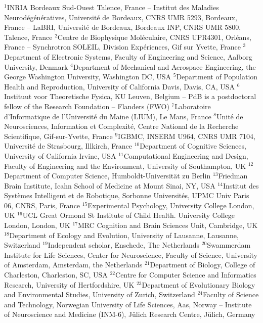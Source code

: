 $^{1}$INRIA Bordeaux Sud-Ouest Talence, France – Institut des Maladies Neurodégénératives, Université de Bordeaux, CNRS UMR 5293, Bordeaux, France – LaBRI, Université de Bordeaux, Bordeaux INP, CNRS UMR 5800, Talence, France
$^{2}$Centre de Biophysique Moléculaire, CNRS UPR4301, Orléans, France -- Synchrotron SOLEIL, Division Expériences, Gif sur Yvette, France
$^{3}$Department of Electronic Systems, Faculty of Engineering and Science, Aalborg University, Denmark
$^{4}$Department of Mechanical and Aerospace Engineering, the George Washington University, Washington DC, USA
$^{5}$Department of Population Health and Reproduction, University of California Davis, Davis, CA, USA
$^{6}$Instituut voor Theoretische Fysica, KU Leuven, Belgium -- PdB is a postdoctoral fellow of the Research Foundation -- Flanders (FWO)
$^{7}$Laboratoire d'Informatique de l'Université du Maine (LIUM), Le Mans, France
$^{8}$Unité de Neurosciences, Information et Complexité, Centre National de la Recherche Scientifique, Gif-sur-Yvette, France
$^{9}$IGBMC, INSERM U964, CNRS UMR 7104, Université de Strasbourg, Illkirch, France
$^{10}$Department of Cognitive Sciences, University of California Irvine, USA
$^{11}$Computational Engineering and Design, Faculty of Engineering and the Environment, University of Southampton, UK
$^{12}$Department of Computer Science, Humboldt-Universität zu Berlin
$^{13}$Friedman Brain Institute, Icahn School of Medicine at Mount Sinai, NY, USA
$^{14}$Institut des Systèmes Intelligent et de Robotique, Sorbonne Universités, UPMC Univ Paris 06, CNRS, Paris, France
$^{15}$Experimental Psychology, University College London, UK
$^{16}$UCL Great Ormond St Institute of Child Health. University College London, London, UK
$^{17}$MRC Cognition and Brain Sciences Unit, Cambridge, UK
$^{18}$Department of Ecology and Evolution, University of Lausanne, Lausanne, Switzerland
$^{19}$Independent scholar, Enschede, The Netherlands
$^{20}$Swammerdam Institute for Life Sciences, Center for Neuroscience, Faculty of Science, University of Amsterdam, Amsterdam, the Netherlands
$^{21}$Department of Biology, College of Charleston, Charleston, SC, USA
$^{22}$Centre for Computer Science and Informatics Research, University of Hertfordshire, UK
$^{23}$Department of Evolutionary Biology and Environmental Studies, University of Zurich, Switzerland
$^{24}$Faculty of Science and Technology, Norwegian University of Life Sciences, Aas, Norway -- Institute of Neuroscience and Medicine (INM-6), Jülich Research Centre, Jülich, Germany
